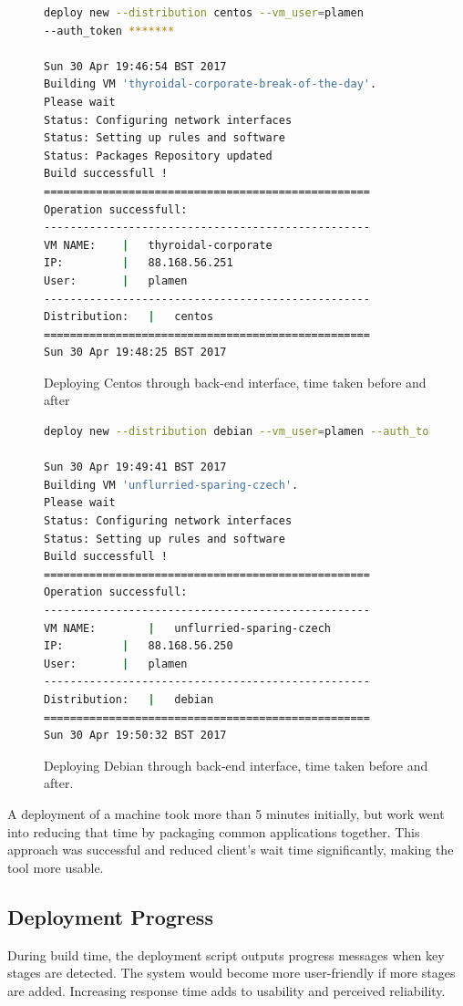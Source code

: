\documentclass{article}
\begin{document}
\begin{figure}
\begin{lstlisting}[frame=single, language=Bash]
deploy new --distribution centos --vm_user=plamen 
--auth_token *******

Sun 30 Apr 19:46:54 BST 2017
Building VM 'thyroidal-corporate-break-of-the-day'.
Please wait 
Status: Configuring network interfaces
Status: Setting up rules and software
Status: Packages Repository updated
Build successfull !
==================================================
Operation successfull:
--------------------------------------------------
VM NAME:    |	thyroidal-corporate
IP:			|	88.168.56.251
User:		|	plamen
--------------------------------------------------
Distribution:	|	centos
==================================================
Sun 30 Apr 19:48:25 BST 2017

\end{lstlisting}
\caption{Deploying Centos through back-end interface, time taken before and after}
\label{fig:deeploy-centos-output}
\end{figure}

\begin{figure}
\begin{lstlisting}[frame=single, language=Bash]
deploy new --distribution debian --vm_user=plamen --auth_token *******

Sun 30 Apr 19:49:41 BST 2017
Building VM 'unflurried-sparing-czech'.
Please wait 
Status: Configuring network interfaces
Status: Setting up rules and software
Build successfull !
==================================================
Operation successfull:
--------------------------------------------------
VM NAME:		|	unflurried-sparing-czech
IP:			|	88.168.56.250
User:		|	plamen
--------------------------------------------------
Distribution:	|	debian
==================================================
Sun 30 Apr 19:50:32 BST 2017
\end{lstlisting}
\caption{Deploying Debian through back-end interface, time taken before and after.}
\label{fig:deeploy-debian-output}
\end{figure}

A deployment of a machine took more than 5 minutes initially, but work went into reducing that time by packaging common applications together. This approach was successful and reduced client's wait time significantly, making the tool more usable.

\subsection{Deployment Progress}
During build time, the deployment script outputs progress messages when key stages are detected. The system would become more user-friendly if more stages are added. Increasing response time adds to usability and perceived reliability.
\end{document}
